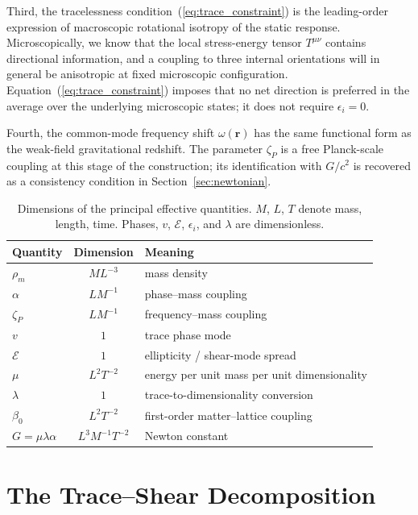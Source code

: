 \documentclass[pdflatex,sn-mathphys-num]{sn-jnl}%
\theoremstyle{thmstyleone}%
\theoremstyle{thmstyletwo}%
\theoremstyle{thmstylethree}%
\begin{document}
Third, the tracelessness
condition~(\ref{eq:trace_constraint}) is the leading-order
expression of macroscopic rotational isotropy of the static
response. Microscopically, we know that the local stress-energy tensor
$T^{\mu\nu}$ contains directional information, and a coupling
to three internal orientations will in general be anisotropic
at fixed microscopic configuration. Equation~(\ref{eq:trace_constraint}) imposes that no net direction is
preferred in the average over the underlying microscopic
states; it does not require $\epsilon_i=0$.

Fourth, the common-mode frequency shift
$\omega(\mathbf{r})$ has the same functional form as the
weak-field gravitational redshift. The parameter $\zeta_P$ is a
free Planck-scale coupling at this stage of the construction;
its identification with $G/c^2$ is recovered as a consistency
condition in Section~\ref{sec:newtonian}.

\begin{table}[h]
\caption{Dimensions of the principal effective quantities. $M$,
$L$, $T$ denote mass, length, time. Phases, $v$,
$\mathcal{E}$, $\epsilon_i$, and $\lambda$ are dimensionless.}
\centering
\begin{tabular}{l c l}
\hline
Quantity & Dimension & Meaning \\
\hline
$\rho_m$ & $ML^{-3}$ & mass density \\
$\alpha$ & $LM^{-1}$ & phase--mass coupling \\
$\zeta_P$ & $LM^{-1}$ & frequency--mass coupling \\
$v$ & $1$ & trace phase mode  \\
$\mathcal{E}$ & $1$ & ellipticity / shear-mode spread \\
$\mu$ & $L^2T^{-2}$ & energy per unit mass per unit dimensionality \\
$\lambda$ & $1$ & trace-to-dimensionality conversion \\
$\beta_0$ & $L^2T^{-2}$ & first-order matter--lattice coupling \\
$G=\mu\lambda\alpha$ & $L^3M^{-1}T^{-2}$ & Newton constant \\
\hline
\end{tabular}
\label{tab:dimensions}
\end{table}

\section{The Trace--Shear Decomposition}
\label{sec:decomposition}
\end{document}
